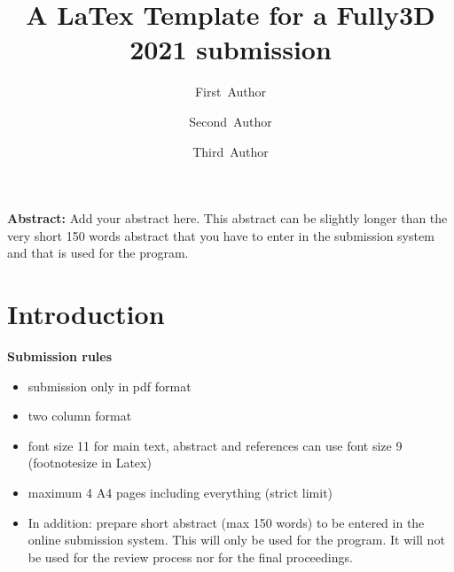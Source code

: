 \documentclass[11pt,twocolumn,twoside]{article}
\begin{document}
\title{A LaTex Template for a Fully3D 2021 submission} 

\author[1]{\small First~Author}
\author[1]{\small Second~Author}
\author[2]{\small Third~Author}



\maketitle
\thispagestyle{fancy}



\footnotesize
\textbf{Abstract:}
Add your abstract here. This abstract can be slightly longer than the very short 
150 words abstract that you have to enter in the submission system and that is used 
for the program. 

\normalsize




\section{Introduction}

\textbf{\color{red}Submission rules}
\begin{itemize}
\color{red}
\item submission only in pdf format
\item two column format
\item font size 11 for main text, abstract and references can use font size 9 (footnotesize in Latex)
\item maximum 4 A4 pages including everything (strict limit)
\item In addition: prepare short abstract (max 150 words) to be entered in the online submission system. 
      This will only be used for the program. 
      It will not be used for the review process nor for the final proceedings.
\end{itemize}
\end{document}
